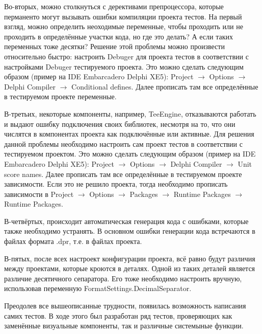 {    \par \redline Во-вторых, можно столкнуться с дерективами препроцессора, которые перманенто могут вызывать ошибки компиляции проекта тестов. На первый взгляд, можно определить неоходимые переменные, чтобы проходить или не проходить в определённые участки кода, но где это делать? А если таких переменных тоже десятки? Решение этой проблемы можно произвести относительно быстро: настроить Debuger для проекта тестов в соответствии с настройками Debuger тестируемого проекта. Это можно сделать следующим образом (пример на IDE Embarcadero Delphi XE5): Project $\rightarrow$ Options $\rightarrow$ Delphi Compiler $\rightarrow$ Conditional defines. Далее прописать там все определённые в тестируемом проекте переменные. 

    \par \redline В-третьих, некоторые компоненты, например, TeeEngine, отказываются работать и выдают ошибку подключения своих библиотек, несмотря на то, что они числятся в компонентах проекта как подключённые или активные. Для решения данной проблемы необходимо настроить сам проект тестов в соответствии с тестируемом проектом. Это можно сделать следующим образом (пример на IDE Embarcadero Delphi XE5): Project $\rightarrow$ Options $\rightarrow$ Delphi Compiler $\rightarrow$ Unit score names. Далее прописать там все определённые в тестируемом проекте зависимости. Если это не решило проекта, тогда необходимо прописать зависимости в Project $\rightarrow$ Options $\rightarrow$ Packages $\rightarrow$ Runtime Packages $\rightarrow$ Runtime Packages.

    \par \redline В-четвёртых, происходит автоматическая генерация кода с ошибками, которые также необходимо устранять. В основном ошибки генерации кода встречаются в файлах формата .dpr, т.е. в файлах проекта. 

    \par \redline В-пятых, после всех настроект конфигурации проекта, всё равно будут различия между проектами, которые кроются в деталях. Одной из таких деталей является различие десятичного сепаратора. Его тоже необходимо настроить вручную, использовав переменную FormatSettings.DecimalSeparator. 

    \par \redline Преодолев все вышеописанные трудности, появилась возможность написания самих тестов. В ходе этого был разработан ряд тестов, проверяющих как заменённые визуальные компоненты, так и различные системыные функции.  

}
